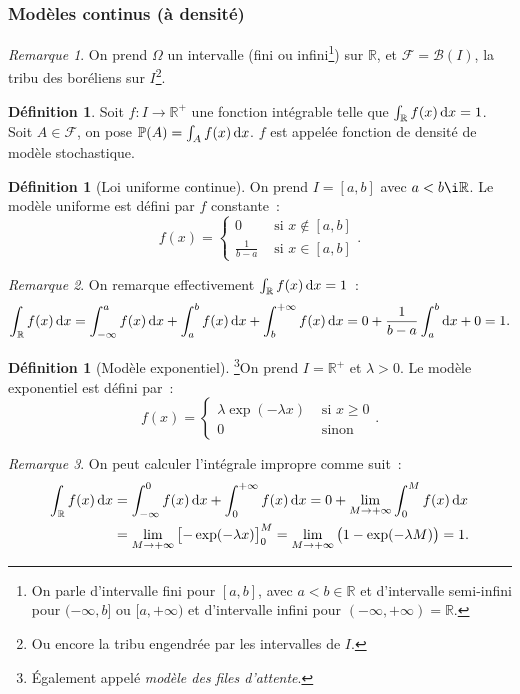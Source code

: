 \documentclass{article}
\renewcommand{\P}{\mathbb P}
\newcommand{\R}{\mathbb R}
\theoremstyle{definition}
\newtheorem{déf}[thm]{Définition}
\theoremstyle{remark}
\newtheorem*{rmq}{Remarque}
\begin{document}
		\subsubsection{Modèles continus (à densité)}
		\begin{rmq} On prend $\Omega$ un intervalle (fini ou infini\footnote{On parle d'intervalle fini pour $[a, b]$, avec $a < b \in \R$ et d'intervalle
		semi-infini pour $(-\infty, b]$ ou $[a, +\infty)$ et d'intervalle infini pour $(-\infty, +\infty) = \R$.}) sur $\R$, et $\mathcal F = \mathcal B(I)$,
		la tribu des boréliens sur $I$\footnote{Ou encore la tribu engendrée par les intervalles de $I$.}. \end{rmq}

		\begin{déf} Soit $f : I \to \R^+$ une fonction intégrable telle que $\int_\R f(x)\dif x = 1$. Soit $A \in \mathcal F$, on pose
		$\P(A) = \int_Af(x)\dif x$. $f$ est appelée fonction de densité de modèle stochastique. \end{déf}

		\begin{déf}[Loi uniforme continue] On prend $I = [a, b]$ avec $a < b \i \R$. Le modèle uniforme est défini par $f$ constante~:
		\[f(x) = \begin{cases}0 &\text{ si }x \not \in [a, b] \\\frac 1{b-a} &\text{ si }x \in [a, b]\end{cases}.\] \end{déf}

		\begin{rmq} On remarque effectivement $\int_\R f(x)\dif x = 1$~:
		\[\int_\R f(x)\dif x = \int_{-\infty}^a f(x)\dif x + \int_a^b f(x)\dif x + \int_b^{+\infty} f(x)\dif x = 0 + \frac 1{b-a}\int_a^b\dif x + 0 = 1.\]
		\end{rmq}

		\begin{déf}[Modèle exponentiel]\footnote{Également appelé \emph{modèle des files d'attente}.}\label{modèleExponentiel} On prend $I = \R^+$ et
		$\lambda > 0$. Le modèle exponentiel est défini par~:
		\[f(x) = \begin{cases}\lambda\exp(-\lambda x) &\text{ si }x \geq 0 \\ 0 &\text{ sinon}\end{cases}.\]
		\end{déf}

		\begin{rmq} On peut calculer l'intégrale impropre comme suit~:
		\[\begin{aligned}
			\int_\R f(x)\dif x &= \int_{-\infty}^0f(x)\dif x + \int_0^{+\infty}f(x)\dif x = 0 + \lim_{M \to +\infty}\int_0^Mf(x)\dif x \\
			&= \lim_{M \to +\infty}\left[-\exp(-\lambda x)\right]_0^M = \lim_{M \to +\infty}\left(1 - \exp(-\lambda M)\right) = 1.
		\end{aligned}\]
		\end{rmq}
\end{document}
